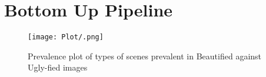 \section{Bottom Up Pipeline}


\begin{figure*}[ht]
	\centering
	\texttt{[image: Plot/.png]}
	\caption{Prevalence plot of types of scenes prevalent in Beautified against Ugly-fied images}
	\label{fig:normedCosine}
\end{figure*}
